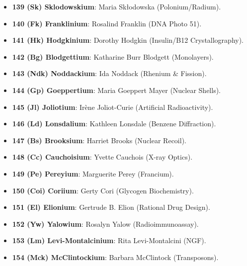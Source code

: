 \documentclass[10pt,twocolumn,a4paper]{article}
\begin{document}
\begin{itemize}
\item \textbf{139 (Sk) Sklodowskium}: Maria Skłodowska (Polonium/Radium).
\item \textbf{140 (Fk) Franklinium}: Rosalind Franklin (DNA Photo 51).
\item \textbf{141 (Hk) Hodgkinium}: Dorothy Hodgkin (Insulin/B12 Crystallography).
\item \textbf{142 (Bg) Blodgettium}: Katharine Burr Blodgett (Monolayers).
\item \textbf{143 (Ndk) Noddackium}: Ida Noddack (Rhenium \& Fission).
\item \textbf{144 (Gp) Goeppertium}: Maria Goeppert Mayer (Nuclear Shells).
\item \textbf{145 (Jl) Joliotium}: Irène Joliot-Curie (Artificial Radioactivity).
\item \textbf{146 (Ld) Lonsdalium}: Kathleen Lonsdale (Benzene Diffraction).
\item \textbf{147 (Bs) Brooksium}: Harriet Brooks (Nuclear Recoil).
\item \textbf{148 (Cc) Cauchoisium}: Yvette Cauchois (X-ray Optics).
\item \textbf{149 (Pe) Pereyium}: Marguerite Perey (Francium).
\item \textbf{150 (Coi) Coriium}: Gerty Cori (Glycogen Biochemistry).
\item \textbf{151 (El) Elionium}: Gertrude B. Elion (Rational Drug Design).
\item \textbf{152 (Yw) Yalowium}: Rosalyn Yalow (Radioimmunoassay).
\item \textbf{153 (Lm) Levi-Montalcinium}: Rita Levi-Montalcini (NGF).
\item \textbf{154 (Mck) McClintockium}: Barbara McClintock (Transposons).
\end{itemize}
\end{document}
